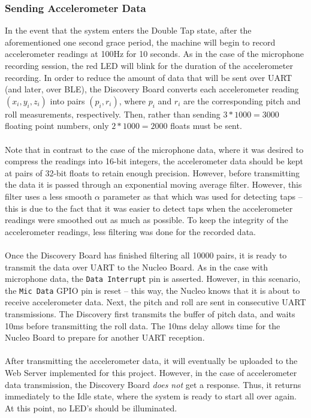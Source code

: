 \subsubsection{Sending Accelerometer Data}
In the event that the system enters the Double Tap state, after the aforementioned one second grace
period, the machine will begin to record accelerometer readings at 100Hz for 10 seconds. As in the
case of the microphone recording session, the red LED will blink for the duration of the
accelerometer recording. In order to reduce the
amount of data that will be sent over UART (and later, over BLE), the Discovery Board converts each
accelerometer reading $(x_i,y_i,z_i)$ into pairs $(p_i,r_i)$, where $p_i$ and $r_i$ are the
corresponding pitch and roll measurements, respectively. Then, rather than sending $3*1000=3000$
floating point numbers, only $2*1000=2000$ floats must be sent.\\\\
Note that in contrast to the case of the microphone data, where it was desired to compress the
readings into 16-bit integers, the accelerometer data should be kept at pairs of 32-bit floats to
retain enough precision. However, before transmitting the data it is passed through an exponential
moving average filter. However, this filter uses a less smooth $\alpha$ parameter as that which was
used for detecting taps -- this is due to the fact that it was easier to detect taps when the
accelerometer readings were smoothed out as much as possible. To keep the integrity of the
accelerometer readings, less filtering was done for the recorded data.\\\\
Once the Discovery Board has finished filtering all 10000 pairs, it is ready to transmit the data
over UART to the Nucleo Board. As in the case with microphone data, the \texttt{Data Interrupt} pin
is asserted. However, in this scenario, the \texttt{Mic Data} GPIO pin is reset -- this way, the
Nucleo knows that it is about to receive accelerometer data. Next, the pitch and roll are sent in
consecutive UART transmissions. The Discovery first transmits the buffer of pitch data, and waits
10ms before transmitting the roll data. The 10ms delay allows time for the Nucleo Board to prepare
for another UART reception.\\\\
After transmitting the accelerometer data, it will eventually be uploaded to the Web Server
implemented for this project. However, in the case of accelerometer data transmission, the Discovery
Board \textit{does not} get a response. Thus, it returns immediately to the Idle state, where the
system is ready to start all over again. At this point, no LED's should be illuminated.


